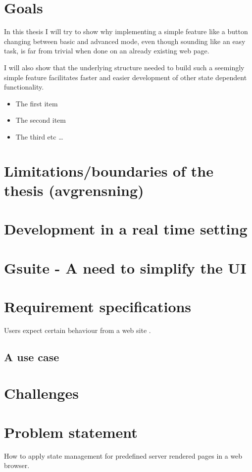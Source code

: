 \documentclass[english]{ifimaster}
\begin{document}
\section{Goals}
In this thesis I will try to show why implementing a simple feature like a button changing between basic and advanced mode, even though sounding like an easy task, is far from trivial when done on an already existing web page. 

I will also show that the underlying structure needed to build such a seemingly simple feature facilitates faster and easier development of other state dependent functionality.
\begin{itemize}
  \item The first item
  \item The second item
  \item The third etc \ldots
\end{itemize}
\section{Limitations/boundaries of the thesis (avgrensning)}

\section{Development in a real time setting}


\section{Gsuite - A need to simplify the UI}

\section{Requirement specifications}
Users expect certain behaviour from a web site \parencite{mik}.
\subsection{A use case}




\section{Challenges}

\section{Problem statement}
How to apply state management for predefined server rendered pages in a web browser.
\end{document}

